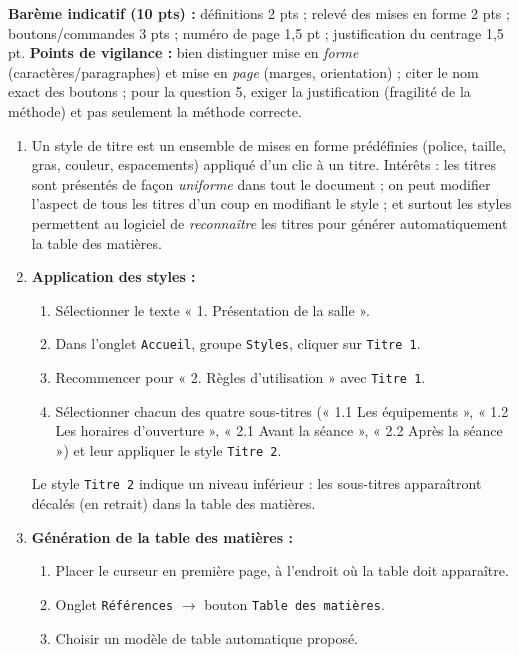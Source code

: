 \documentclass[11pt]{article}
\newcommand{\cle}[1]{{\popxbold\color{popdark}#1}}
\begin{document}
\begin{corrige}
\begin{enumerate}
\end{enumerate}
\textbf{Barème indicatif (10 pts) :} définitions 2 pts ; relevé des mises en forme 2 pts ; boutons/commandes 3 pts ; numéro de page 1,5 pt ; justification du centrage 1,5 pt.
\textbf{Points de vigilance :} bien distinguer mise en \emph{forme} (caractères/paragraphes) et mise en \emph{page} (marges, orientation) ; citer le nom exact des boutons ; pour la question 5, exiger la justification (fragilité de la méthode) et pas seulement la méthode correcte.
\end{corrige}

\begin{corrige}
\begin{enumerate}
\item Un \cle{style de titre} est un ensemble de mises en forme prédéfinies (police, taille, gras, couleur, espacements) appliqué d'un clic à un titre. Intérêts : les titres sont présentés de façon \emph{uniforme} dans tout le document ; on peut modifier l'aspect de tous les titres d'un coup en modifiant le style ; et surtout les styles permettent au logiciel de \emph{reconnaître} les titres pour générer automatiquement la table des matières.
\item \textbf{Application des styles :}
\begin{enumerate}
\item Sélectionner le texte « 1. Présentation de la salle ».
\item Dans l'onglet \texttt{Accueil}, groupe \texttt{Styles}, cliquer sur \texttt{Titre 1}.
\item Recommencer pour « 2. Règles d'utilisation » avec \texttt{Titre 1}.
\item Sélectionner chacun des quatre sous-titres (« 1.1 Les équipements », « 1.2 Les horaires d'ouverture », « 2.1 Avant la séance », « 2.2 Après la séance ») et leur appliquer le style \texttt{Titre 2}.
\end{enumerate}
Le style \texttt{Titre 2} indique un niveau inférieur : les sous-titres apparaîtront décalés (en retrait) dans la table des matières.
\item \textbf{Génération de la table des matières :}
\begin{enumerate}
\item Placer le curseur en première page, à l'endroit où la table doit apparaître.
\item Onglet \texttt{Références} $\to$ bouton \texttt{Table des matières}.
\item Choisir un modèle de table automatique proposé.

\end{enumerate}
\end{enumerate}
\end{corrige}
\end{document}
